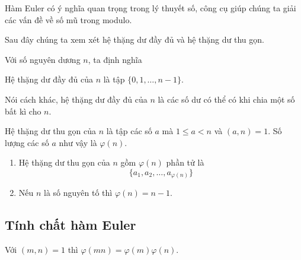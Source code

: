 Hàm Euler có ý nghĩa quan trọng trong lý thuyết số, công cụ giúp chúng ta giải các vấn đề về số mũ trong modulo.

Sau đây chúng ta xem xét hệ thặng dư đầy đủ và hệ thặng dư thu gọn.

Với số nguyên dương $n$, ta định nghĩa

\begin{definition}
    Hệ thặng dư đầy đủ của $n$ là tập $\{0, 1, \ldots, n-1\}$.
\end{definition}

Nói cách khác, hệ thặng dư đầy đủ của $n$ là các số dư có thể có khi chia một số bất kì cho $n$.

\begin{definition}
    Hệ thặng dư thu gọn của $n$ là tập các số $a$ mà $1 \leqslant a < n$ và $(a, n) = 1$. Số lượng các số $a$ như vậy là $\varphi (n)$.  
\end{definition}

\begin{remark}
    \begin{enumerate}
        \item Hệ thặng dư thu gọn của $n$ gồm $\varphi(n)$ phần tử là \[ \{a_1, a_2, \ldots, a_{\varphi(n)}\} \]
        \item Nếu $n$ là số nguyên tố thì $\varphi(n) = n-1$.
    \end{enumerate}
\end{remark}

\subsection*{Tính chất hàm Euler}

\begin{remark}
    Với $(m, n) = 1$ thì $\varphi(m n) = \varphi(m) \varphi(n)$.
\end{remark}

